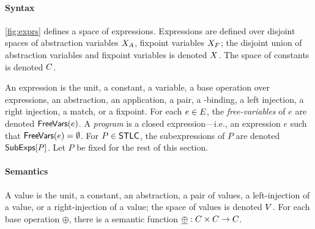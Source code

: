 \paragraph{Syntax}
\autoref{fig:exprs} defines a space of expressions.
%
Expressions are defined over disjoint spaces of abstraction variables
$X_A$, fixpoint variables $X_F$;
%
the disjoint union of abstraction variables and fixpoint variables is
denoted $X$.
%
The space of constants is denoted $C$.

An expression is the unit, a constant, a variable, a base operation
over expressions, an abstraction, an application, a pair, a
-binding, a left injection, a right injection, a match, or a
fixpoint.
%
For each $e \in E$, the \emph{free-variables} of $e$ are denoted
$\mathsf{FreeVars}(e)$.
%
A \emph{program} is a closed expression---i.e., an expression $e$
such that $\mathsf{FreeVars}(e) = \emptyset$.
%
For $P \in \mathsf{STLC}$, the subexpressions of $P$ are denoted
$\mathsf{SubExps}[  P  ]$.
%
Let $P$ be fixed for the rest of this section.

\paragraph{Semantics}
%
A value is the unit, a constant, an abstraction, a pair of values, a
left-injection of a value, or a right-injection of a value;
%
the space of values is denoted $V$.
%
For each base operation $\oplus$, there is a semantic function
$\underline{\oplus} : C \times C \to C$.

